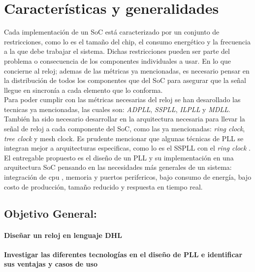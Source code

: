 \documentclass[runningheads,a4paper]{llncs}
\begin{document}
\section{Características y generalidades}

Cada implementación de un SoC está caracterizado por un conjunto de restricciones, como lo es el tamaño del chip, el consumo energético y la frecuencia a la que debe trabajar el sistema. Dichas restricciones pueden ser parte del problema o consecuencia de los componentes individuales a usar. En lo que concierne al reloj; ademas de las métricas ya mencionadas, es necesario pensar en la distribución de todos los componentes que del SoC para asegurar que la señal llegue en sincronía a cada elemento que lo conforma.\\

Para poder cumplir con las métricas necesarias del reloj se han desarollado las tecnicas ya mencionadas, las cuales son: \textit{ADPLL}, \textit{SSPLL}, \textit{ILPLL} y \textit{MDLL}. También ha sido necesario desarrollar en la arquitectura necesaria para llevar la señal de reloj a cada componente del SoC, como las ya mencionadas: \textit{ring clock}, \textit{tree clock} y {mesh clock}. Es prudente mencionar que algunas técnicas de PLL se integran mejor a arquitecturas especificas, como lo es el SSPLL con el \textit{ring clock} . El entregable propuesto es el diseño de un PLL y su implementación en una arquitectura SoC pensando en las necesidades más generales de un sistema: integración de cpu , memoria y puertos perifericos, bajo consumo de energía, bajo costo de producción, tamaño reducido y respuesta en tiempo real. 



\subsection{Objetivo General:}
\paragraph{Diseñar un reloj en lenguaje DHL}
\paragraph{Investigar las diferentes tecnologías en el diseño de PLL e identificar sus ventajas y casos de uso}
\end{document}

